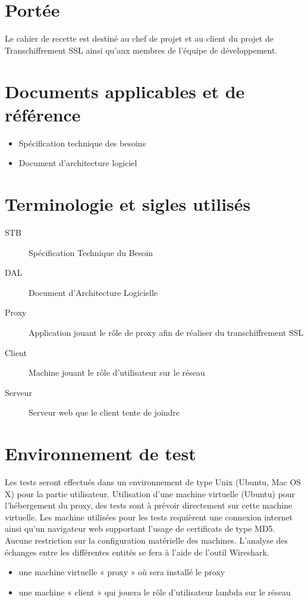 \documentclass[a4paper,11pt,french]{article}
\begin{document}
\section{Portée}
Le cahier de recette est destiné au chef de projet et au client du projet de
Transchiffrement SSL ainsi qu’aux membres de l’équipe de développement.


\section{Documents applicables et de référence}

\begin{itemize}
  \item Spécification technique des besoins
  \item Document d'architecture logiciel
\end{itemize}

\section{Terminologie et sigles utilisés}

\begin{description}
  \item[STB] Spécification Technique du Besoin
  \item[DAL] Document d’Architecture Logicielle
  \item[Proxy] Application jouant le rôle de proxy afin de réaliser du transchiffrement SSL
  \item[Client] Machine jouant le rôle d'utilisateur sur le réseau
  \item[Serveur] Serveur web que le client tente de joindre
\end{description}

\section{Environnement de test}
Les tests seront effectués dans un environnement de type Unix (Ubuntu, Mac OS 
X) pour la partie utilisateur. Utilisation d'une machine virtuelle (Ubuntu) pour l'hébergement du 
proxy, des tests sont à prévoir directement sur cette machine virtuelle. Les 
machine utilisées pour les tests requièrent une connexion internet ainsi qu'un
navigateur web supportant l'usage de certificats de type MD5. Aucune restriction 
sur la configuration matérielle des machines.
L'analyse des échanges entre les différentes entités se fera à l'aide de 
l'outil Wireshark.
\begin{itemize}
\item une machine virtuelle « proxy » où sera installé le proxy 
\item une machine « client » qui jouera le rôle d'utilisateur lambda sur le réseau
\end{itemize}
\end{document}
